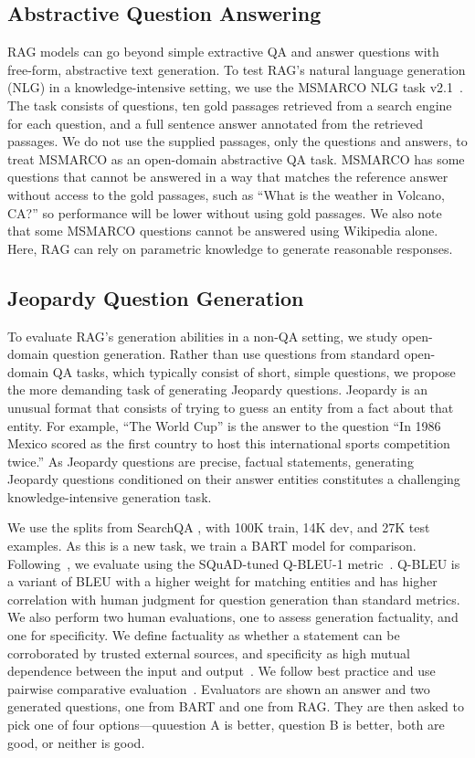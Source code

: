 \documentclass{article}
\begin{document}
\subsection{Abstractive Question Answering}

RAG models 
can go beyond simple extractive QA 
and answer questions with free-form, abstractive text generation. To test RAG's natural language generation (NLG) in a knowledge-intensive setting, we use the MSMARCO NLG task v2.1~\cite{DBLP:conf/nips/NguyenRSGTMD16}. The task consists of questions, ten gold passages retrieved from a search engine for each question, and a full sentence answer annotated from the retrieved passages.
We do not use the supplied passages, only the questions and answers, to treat MSMARCO as an open-domain abstractive QA task. MSMARCO has some questions that cannot be answered in a way that matches the reference answer without access to the gold passages, such as ``What is the weather in Volcano, CA?'' so performance will be lower without using gold passages. 
We also note that some MSMARCO questions cannot be answered using Wikipedia alone. Here, RAG can rely on parametric knowledge to generate reasonable responses.

\subsection{Jeopardy Question Generation}

To evaluate RAG's generation abilities in a non-QA setting, we study open-domain question generation.
Rather than use questions from standard open-domain QA tasks, which typically consist of short, simple questions, we propose the more demanding task of generating Jeopardy questions. Jeopardy is an unusual format that consists of trying to guess an entity from a fact about that entity. For example, ``The World Cup'' is the answer to the question ``In 1986 Mexico scored as the first country to host this international sports competition twice.'' As Jeopardy questions are precise, factual statements, generating Jeopardy questions conditioned on their answer entities constitutes a challenging knowledge-intensive generation task. 

We use the splits from SearchQA
\cite{dunn_searchqa:_2017}, with 100K train, 14K dev, and 27K test examples. 
As this is a new task, we train a BART model for comparison.
Following~\cite{zhang-bansal-2019-addressing}, we evaluate using the SQuAD-tuned Q-BLEU-1 metric~\cite{nema-khapra-2018-towards}. Q-BLEU is a variant of BLEU with a higher weight for matching entities and has higher correlation with human judgment for question generation than standard metrics. 
We also perform two human evaluations, one to assess generation factuality, and one for specificity. We define factuality as whether a statement can be corroborated by trusted external sources, and specificity as high mutual dependence between the input and output~\cite{li-etal-2016-diversity}. 
We follow best practice and use pairwise comparative evaluation~\cite{Li2019ACUTEEVALID}. Evaluators are shown an answer and two generated questions, one from BART and one from RAG. They are then asked to pick one of four options---quuestion A is better, question B is better, both are good, or neither is good.
\end{document}
